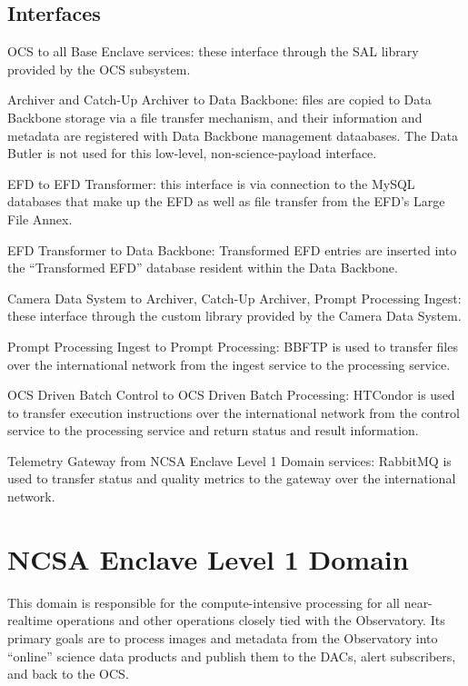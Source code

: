 \documentclass[]{article}
\begin{document}
\subsection{Interfaces}\label{interfaces}

OCS to all Base Enclave services: these interface through the SAL
library provided by the OCS subsystem.

Archiver and Catch-Up Archiver to Data Backbone: files are copied to
Data Backbone storage via a file transfer mechanism, and their
information and metadata are registered with Data Backbone management
dataabases. The Data Butler is not used for this low-level,
non-science-payload interface.

EFD to EFD Transformer: this interface is via connection to the MySQL
databases that make up the EFD as well as file transfer from the EFD's
Large File Annex.

EFD Transformer to Data Backbone: Transformed EFD entries are inserted
into the ``Transformed EFD'' database resident within the Data Backbone.

Camera Data System to Archiver, Catch-Up Archiver, Prompt Processing
Ingest: these interface through the custom library provided by the
Camera Data System.

Prompt Processing Ingest to Prompt Processing: BBFTP is used to transfer
files over the international network from the ingest service to the
processing service.

OCS Driven Batch Control to OCS Driven Batch Processing: HTCondor is
used to transfer execution instructions over the international network
from the control service to the processing service and return status and
result information.

Telemetry Gateway from NCSA Enclave Level 1 Domain services: RabbitMQ is
used to transfer status and quality metrics to the gateway over the
international network.

\section{NCSA Enclave Level 1 Domain}\label{ncsa-enclave-level-1-domain}

This domain is responsible for the compute-intensive processing for all
near-realtime operations and other operations closely tied with the
Observatory. Its primary goals are to process images and metadata from
the Observatory into ``online'' science data products and publish them
to the DACs, alert subscribers, and back to the OCS.
\end{document}
